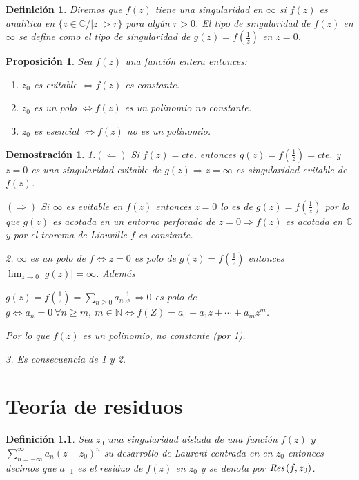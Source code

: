 \documentclass[12pt]{book}
\newtheorem{defi}{Definición}[chapter]
\newtheorem{prop}{Proposición}[chapter]
\newtheorem*{dem}{Demostración}
\newcommand{\C}{\mathbb{C}}
\newcommand{\N}{\mathbb{N}}
\newcommand{\Res}{\emph{Res}\hspace{0.5mm}}
\begin{document}
\begin{defi}
Diremos que $f(z)$ tiene una singularidad en $\infty$ si $f(z)$ es analítica en $\{z\in\C / |z|>r\}$ para algún $r>0$.
El tipo de singularidad de $f(z)$ en $\infty$ se define como el tipo de singularidad de $g(z) = f\left(\frac{1}{z}\right)$ en $z=0$.
\end{defi}

\begin{prop}
Sea $f(z)$ una función entera entonces:
\begin{enumerate}
\item $z_0$ es evitable $\Leftrightarrow f(z)$ es constante.
\item $z_0$ es un polo $\Leftrightarrow f(z)$ es un polinomio no constante.
\item $z_0$ es esencial $\Leftrightarrow f(z)$ no es un polinomio.
\end{enumerate}
\end{prop}

\begin{dem}
1.$(\Leftarrow)$ Si $f(z) = cte.$ entonces $g(z) = f\left(\frac{1}{z}\right)= cte.$ y $z=0$ es una singularidad evitable de $g(z)\Rightarrow z=\infty$ es singularidad evitable de $f(z)$.

$(\Rightarrow)$ Si $\infty$ es evitable en $f(z)$ entonces $z=0$ lo es de $g(z) = f\left(\frac{1}{z}\right)$ por lo que $g(z)$ es acotada en un entorno perforado de $z=0 \Rightarrow f(z)$ es acotada en $\C$ y por el teorema de Liouville $f$ es constante.

2. $\infty$ es un polo de $f\Leftrightarrow z=0$ es polo de $g(z) = f\left(\frac{1}{z}\right)$ entonces $\lim_{z\to 0}|g(z)| = \infty$. Además

$g(z) = f\left(\frac{1}{z}\right) = \sum_{n\geq 0} a_n \frac{1}{z^n}\Leftrightarrow 0$ es polo de $g \Leftrightarrow a_n=0\ \forall n\geq m,\ m\in\N\Leftrightarrow f(Z) = a_0 + a_1z + \cdots + a_mz^m$.

 Por lo que $f(z)$ es un polinomio, no constante (por 1).

3. Es consecuencia de 1 y 2. 
\end{dem}


\chapter{Teoría de residuos}

\begin{defi}
Sea $z_0$ una singularidad aislada de una función $f(z)$ y $\displaystyle \sum_{n=-\infty}^{\infty} a_n (z-z_0)^n$ su desarrollo de Laurent centrada en en $z_0$ entonces decimos que $a_{-1}$ es el residuo de $f(z)$ en $z_0$ y se denota por $\Res(f,z_0)$.
\end{defi}
\end{document}
